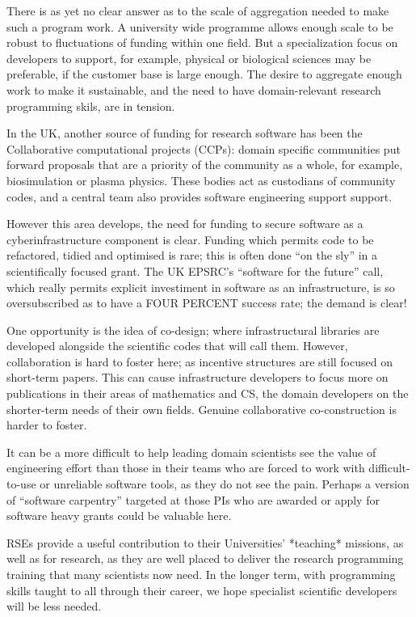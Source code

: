 There is as yet no clear answer as to the scale of aggregation needed to
make such a program work. A university wide programme allows enough scale to
be robust to fluctuations of funding within one field.
But a specialization focus on developers to support, for example,
physical or biological
sciences may be preferable, if the customer base is large enough.
The desire to aggregate enough work to make it sustainable, and the need to
have domain-relevant research programming skils, are in tension.

In the UK, another source of funding for research software has been the
Collaborative computational projects (CCPs): domain specific communities put
forward proposals that are a priority of the community as a whole, for example,
biosimulation or plasma physics. These bodies act as custodians of community codes,
and a central team also provides software engineering support support.

However this area develops, the need for funding to secure software as a
cyberinfrastructure component is clear. Funding which permits code to be
refactored, tidied and optimised is rare; this is often done ``on the sly''
in a scientifically focused grant. The UK EPSRC's ``software for the future''
call, which really permits explicit investiment in software as an infrastructure,
is so oversubscribed as to have a FOUR PERCENT success rate; the demand is clear!

One opportunity is the idea of co-design; where infrastructural libraries are
developed alongside the scientific codes that will call them. However,
collaboration is hard to foster here; as incentive structures are still focused
on short-term papers. This can cause infrastructure developers to
focus more on publications
in their areas of mathematics and CS, the domain developers on the shorter-term
needs of their own fields. Genuine collaborative co-construction
is harder to foster.

It can be a more difficult
to help leading domain scientists see the value of engineering effort than those
in their teams who are forced to work with difficult-to-use or unreliable
software tools, as they do not see the pain. Perhaps a version of
``software carpentry'' targeted at those PIs
who are awarded or apply for software heavy grants could be valuable here.

RSEs provide a useful contribution to their Universities' *teaching* missions,
as well as for research, as they are well placed to deliver the research programming
training that many scientists now need. In the
longer term, with programming skills taught to all through their career,
we hope specialist
scientific developers will be less needed.

